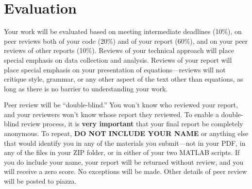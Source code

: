 \documentclass[12pt]{article}
\begin{document}
\section{Evaluation}

Your work will be evaluated based on meeting intermediate deadlines (10\%), on peer reviews both of your code (20\%) and of your report (60\%), and on your peer reviews of other reports (10\%). Reviews of your technical approach will place special emphasis on data collection and analysis. Reviews of your report will place special emphasis on your presentation of equations---reviews will not critique style, grammar, or any other aspect of the text other than equations, as long as there is no barrier to understanding your work.

Peer review will be ``double-blind.'' You won't know who reviewed your report, and your reviewers won't know whose report they reviewed. To enable a double-blind review process, it is \textbf{very important} that your final report be completely anonymous. To repeat, \textbf{DO NOT INCLUDE YOUR NAME} or anything else that would identify you in any of the materials you submit---not in your PDF, in any of the files in your ZIP folder, or in either of your two MATLAB scripts. If you do include your name, your report will be returned without review, and you will receive a zero score. No exceptions will be made. Other details of peer review will be posted to piazza.




\end{document}
